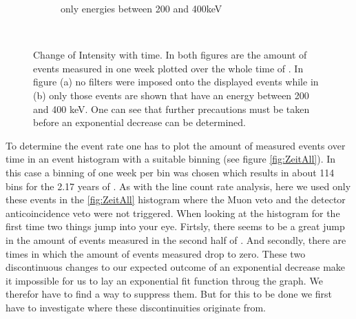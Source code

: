 \begin{figure}[t!]
\begin{subfigure}{.5\textwidth}
		\caption{only energies between 200 and 400keV}
		\label{fig:ZeitLimits}
	\end{subfigure}
    \\
    \caption{Change of Intensity with time. In both figures are the amount of events measured in one week plotted over the whole time of \PII. In figure (a) no filters were imposed onto the displayed events while in (b) only those events are shown that have an energy between 200 and 400 keV. One can see that further precautions must be taken before an exponential decrease can be determined. }
\end{figure}

To determine the event rate one has to plot the amount of measured events over time in an event histogram with a suitable binning (see figure \ref{fig:ZeitAll}).
In this case a binning of one week per bin was chosen which results in about 114 bins for the 2.17 years of \PII.
As with the line count rate analysis, here we used only these events in the \ref{fig:ZeitAll} histogram where the Muon veto and the detector anticoincidence veto were not triggered.
When looking at the histogram for the first time two things jump into your eye.
Firtsly, there seems to be a great jump in the amount of events measured in the second half of \PII.
And secondly, there are times in which the amount of events measured drop to zero.
These two discontinuous changes to our expected outcome of an exponential decrease make it impossible for us to lay an exponential fit function throug the graph.
We therefor have to find a way to suppress them.
But for this to be done we first have to investigate where these discontinuities originate from.
\\

